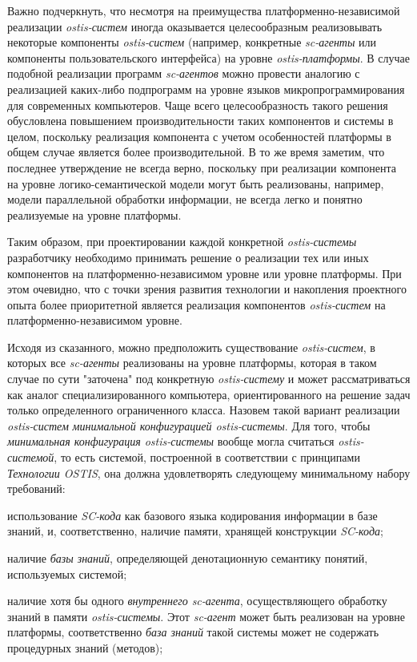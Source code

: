 Важно подчеркнуть, что несмотря на преимущества платформенно-независимой реализации \textit{ostis-систем} иногда оказывается целесообразным реализовывать некоторые компоненты \textit{ostis-систем} (например, конкретные \textit{sc-агенты} или компоненты пользовательского интерфейса) на уровне \textit{ostis-платформы}. В случае подобной реализации программ \textit{sc-агентов} можно провести аналогию с реализацией каких-либо подпрограмм на уровне языков микропрограммирования для современных компьютеров. Чаще всего целесообразность такого решения обусловлена повышением производительности таких компонентов и системы в целом, поскольку реализация компонента с учетом особенностей платформы в общем случае является более производительной. В то же время заметим, что последнее утверждение не всегда верно, поскольку при реализации компонента на уровне логико-семантической модели могут быть реализованы, например, модели параллельной обработки информации, не всегда легко и понятно реализуемые на уровне платформы.

Таким образом, при проектировании каждой конкретной \textit{ostis-системы} разработчику необходимо принимать решение о реализации тех или иных компонентов на платформенно-независимом уровне или уровне платформы. При этом очевидно, что с точки зрения развития технологии и накопления проектного опыта более приоритетной является реализация компонентов \textit{ostis-систем} на платформенно-независимом уровне.

Исходя из сказанного, можно предположить существование \textit{ostis-систем}, в которых все \textit{sc-агенты} реализованы на уровне платформы, которая в таком случае по сути "заточена"{} под конкретную \textit{ostis-систему} и может рассматриваться как аналог специализированного компьютера, ориентированного на решение задач только определенного ограниченного класса. Назовем такой вариант реализации \textit{ostis-систем} \textit{минимальной конфигурацией ostis-системы}. Для того, чтобы \textit{минимальная конфигурация ostis-системы} вообще могла считаться \textit{ostis-системой}, то есть системой, построенной в соответствии с принципами \textit{Технологии OSTIS}, она должна удовлетворять следующему минимальному набору требований:
\begin{textitemize}
	\item использование \textit{SC-кода} как базового языка кодирования информации в базе знаний, и, соответственно, наличие памяти, хранящей конструкции \textit{SC-кода};
	\item наличие \textit{базы знаний}, определяющей денотационную семантику понятий, используемых системой;
	\item наличие хотя бы одного \textit{внутреннего sc-агента}, осуществляющего обработку знаний в памяти \textit{ostis-системы}. Этот \textit{sc-агент} может быть реализован на уровне платформы, соответственно \textit{база знаний} такой системы может не содержать процедурных знаний (методов);
\end{textitemize}

